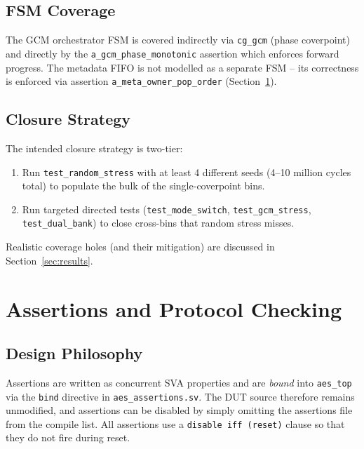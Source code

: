 \documentclass[conference,10pt,a4paper]{IEEEtran}
\begin{document}
\subsection{FSM Coverage}
The GCM orchestrator FSM is covered indirectly via \texttt{cg\_gcm}
(phase coverpoint) and directly by the
\texttt{a\_gcm\_phase\_monotonic} assertion which enforces forward
progress.  The metadata FIFO is not modelled as a separate FSM -- its
correctness is enforced via assertion
\texttt{a\_meta\_owner\_pop\_order} (Section~\ref{sec:assertions}).

\subsection{Closure Strategy}
The intended closure strategy is two-tier:
\begin{enumerate}
  \item Run \texttt{test\_random\_stress} with at least 4 different
        seeds (4--10 million cycles total) to populate the bulk of the
        single-coverpoint bins.
  \item Run targeted directed tests
        (\texttt{test\_mode\_switch}, \texttt{test\_gcm\_stress},
        \texttt{test\_dual\_bank}) to close cross-bins that random
        stress misses.
\end{enumerate}
Realistic coverage holes (and their mitigation) are discussed in
Section~\ref{sec:results}.

\section{Assertions and Protocol Checking}
\label{sec:assertions}

\subsection{Design Philosophy}
Assertions are written as concurrent SVA properties and are
\emph{bound} into \texttt{aes\_top} via the \texttt{bind} directive in
\texttt{aes\_assertions.sv}.  The DUT source therefore remains
unmodified, and assertions can be disabled by simply omitting the
assertions file from the compile list.  All assertions use a
\texttt{disable iff (reset)} clause so that they do not fire during
reset.
\end{document}
